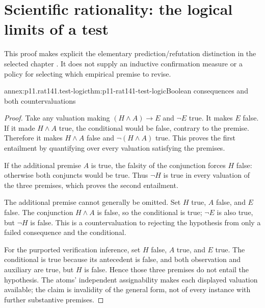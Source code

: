 \section{Scientific rationality: the logical limits of a test}
\label{sec:p11-rat141-annex}

This proof makes explicit the elementary prediction/refutation distinction
in the selected chapter \parencite[pp.~747--748]{AndersenAndersen2021Scientific}.
It does not supply an inductive confirmation measure or a policy for
selecting which empirical premise to revise.

\begin{annexitem}{annex:p11.rat141.test-logic}{thm:p11-rat141-test-logic}{Boolean consequences and both countervaluations}
\begin{proof}
Take any valuation making \((H\land A)\to E\) and \(\neg E\)
true. It makes \(E\) false. If it made \(H\land A\) true,
the conditional would be false, contrary to the premise. Therefore
it makes \(H\land A\) false and \(\neg(H\land A)\) true.
This proves the first entailment by quantifying over every valuation
satisfying the premises.

If the additional premise \(A\) is true, the falsity of the conjunction
forces \(H\) false: otherwise both conjuncts would be true.
Thus \(\neg H\) is true in every valuation of the three premises,
which proves the second entailment.

The additional premise cannot generally be omitted. Set \(H\) true,
\(A\) false, and \(E\) false. The conjunction \(H\land A\)
is false, so the conditional is true; \(\neg E\) is also true,
but \(\neg H\) is false. This is a countervaluation to rejecting
the hypothesis from only a failed consequence and the conditional.

For the purported verification inference, set \(H\) false, \(A\)
true, and \(E\) true. The conditional is true because its antecedent
is false, and both observation and auxiliary are true, but \(H\)
is false. Hence those three premises do not entail the hypothesis.
The atoms' independent assignability makes each displayed valuation
available; the claim is invalidity of the general form, not of every
instance with further substantive premises.
\end{proof}
\end{annexitem}
